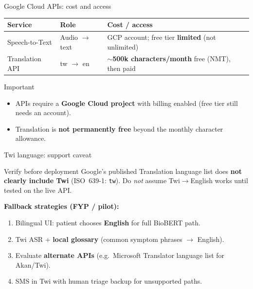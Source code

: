 \documentclass[aspectratio=169,11pt]{beamer}
\begin{document}
\begin{frame}{Google Cloud APIs: cost and access}
	\small
	\begin{tabular}{@{}p{}p{}p{}@{}}
		\toprule
		\textbf{Service} & \textbf{Role} & \textbf{Cost / access} \\
		\midrule
		Speech-to-Text & Audio $\rightarrow$ text & GCP account; free tier \textbf{limited} (not unlimited) \\
		Translation API & tw $\rightarrow$ en & $\sim$\textbf{500k characters/month} free (NMT), then paid \\
		\bottomrule
	\end{tabular}

	\vspace{0.4em}
	\begin{alertblock}{Important}
		\begin{itemize}
			\item APIs require a \textbf{Google Cloud project} with billing enabled (free tier still needs an account).
			\item Translation is \textbf{not permanently free} beyond the monthly character allowance.
		\end{itemize}
	\end{alertblock}
\end{frame}

\begin{frame}{Twi language: support caveat}
	\begin{alertblock}{Verify before deployment}
		Google's published Translation language list does \textbf{not clearly include Twi} (ISO~639-1: \texttt{tw}). Do \textit{not} assume Twi$\rightarrow$English works until tested on the live API.
	\end{alertblock}

	\textbf{Fallback strategies (FYP / pilot):}
	\begin{enumerate}
		\item Bilingual UI: patient chooses \textbf{English} for full BioBERT path.
		\item Twi ASR + \textbf{local glossary} (common symptom phrases $\rightarrow$ English).
		\item Evaluate \textbf{alternate APIs} (e.g.\ Microsoft Translator language list for Akan/Twi).
		\item SMS in Twi with human triage backup for unsupported paths.
	\end{enumerate}
\end{frame}
\end{document}
